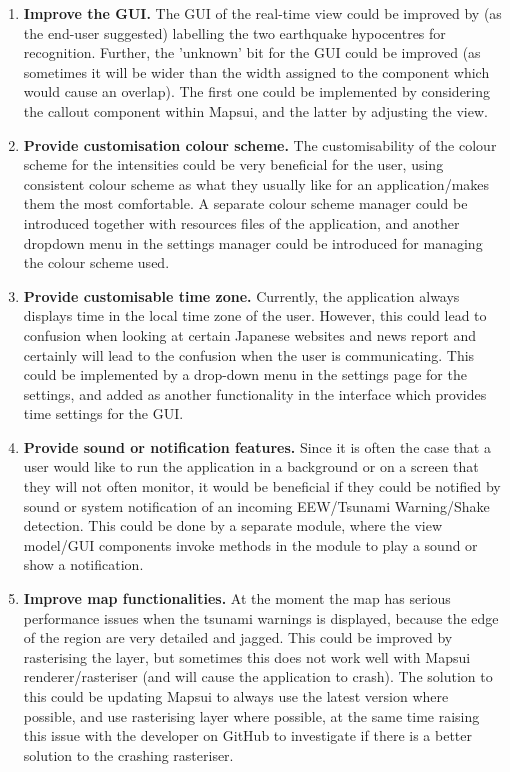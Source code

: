 \begin{enumerate}
    \item \textbf{Improve the GUI.} The GUI of the real-time view could be improved by (as the end-user suggested) labelling the two earthquake hypocentres for recognition. Further, the 'unknown' bit for the GUI could be improved (as sometimes it will be wider than the width assigned to the component which would cause an overlap). The first one could be implemented by considering the callout component within Mapsui, and the latter by adjusting the view.
    \item \textbf{Provide customisation colour scheme.} The customisability of the colour scheme for the intensities could be very beneficial for the user, using consistent colour scheme as what they usually like for an application/makes them the most comfortable. A separate colour scheme manager could be introduced together with resources files of the application, and another dropdown menu in the  settings manager could be introduced for managing the colour scheme used.
    \item \textbf{Provide customisable time zone.} Currently, the application always displays time in the local time zone of the user. However, this could lead to confusion when looking at certain Japanese websites and news report and certainly will lead to the confusion when the user is communicating. This could be implemented by a drop-down menu in the settings page for the settings, and added as another functionality in the  interface which provides time settings for the GUI.
    \item \textbf{Provide sound or notification features.} Since it is often the case that a user would like to run the application in a background or on a screen that they will not often monitor, it would be beneficial if they could be notified by sound or system notification of an incoming EEW/Tsunami Warning/Shake detection. This could be done by a separate module, where the view model/GUI components invoke methods in the module to play a sound or show a notification.
    \item \textbf{Improve map functionalities.} At the moment the map has serious performance issues when the tsunami warnings is displayed, because the edge of the region are very detailed and jagged. This could be improved by rasterising the layer, but sometimes this does not work well with Mapsui renderer/rasteriser (and will cause the application to crash). The solution to this could be updating Mapsui to always use the latest version where possible, and use rasterising layer where possible, at the same time raising this issue with the developer on GitHub to investigate if there is a better solution to the crashing rasteriser.
\end{enumerate}
